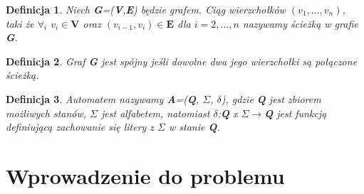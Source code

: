 \documentclass[12pt,a4paper]{article}
\newtheorem{df}{Definicja}[section]
\begin{document}
\begin{df} 
Niech \textbf{G}=(\textbf{V},\textbf{E}) b\k{e}dzie grafem. Ci\k{a}g wierzcho{\l}k\'ow $(v_{1},\ldots,v_{n})$, taki \.ze $\forall_{i}$ $v_{i}\in\textbf{V}$ oraz  $(v_{i-1},v_{i})\in\textbf{E}$ dla $i=2,\ldots,n$ nazywamy \'scie\.zk\k{a} w grafie \textbf{G}.
\end{df} 
\begin{df} 
Graf \textbf{G} jest sp\'ojny je\'sli dowolne dwa jego wierzcho{\l}ki s\k{a} po{\l}\k{a}czone \'scie\.zk\k{a}.
\end{df}
\begin{df} 
Automatem nazywamy \textbf{A}=(\textbf{Q}, \textbf{$\Sigma$}, \textbf{$\delta$}), gdzie \textbf{Q} jest zbiorem mo\.{z}liwych stan\'{o}w, \textbf{$\Sigma$} jest alfabetem, natomiast \textbf{$\delta$}:\textbf{Q} x \textbf{$\Sigma$}$\rightarrow$\textbf{Q} jest funkcj\k{a} definiuj\k{a}c\k{a} 	zachowanie si\k{e} litery z \textbf{$\Sigma$} w stanie \textbf{Q}.
\end{df}


\newpage
\section{Wprowadzenie do problemu}
\end{document}
